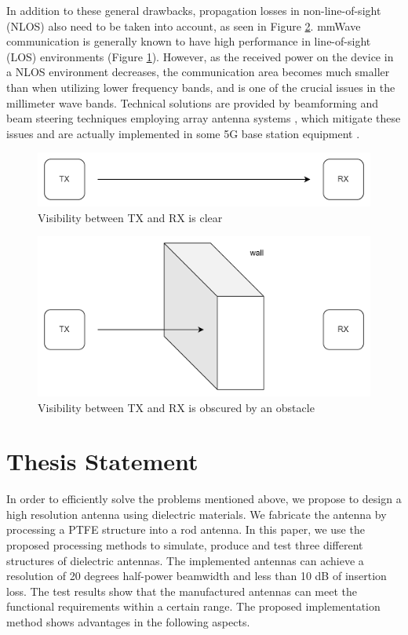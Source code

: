 \documentclass[a4paper,12pt]{report}
\begin{document}
In addition to these general drawbacks,
propagation losses in non-line-of-sight (NLOS) also need to be taken into account,
as seen in Figure \ref{fig:NLOS}.
mmWave communication is generally
known to have high performance in line-of-sight (LOS) environments (Figure \ref{fig:LOS}).
However, as the received power on the device in a NLOS environment decreases,
the communication area becomes much smaller than when
utilizing lower frequency bands,
and is one of the crucial issues in the millimeter wave bands.
Technical solutions are provided by beamforming and
beam steering techniques employing array antenna systems
\cite{6515173} \cite{7444357} \cite{9038647} \cite{7377934} \cite{8516345},
which mitigate these issues and are
actually implemented in some 5G base station equipment
\cite{https://doi.org/10.48550/arxiv.2001.05021}.


\begin{figure}
  \begin{center}
    \includegraphics[clip, keepaspectratio, width=0.5\linewidth]{img/LOS.png}
    \caption{Visibility between TX and RX is clear}
    \label{fig:LOS}
  \end{center}
\end{figure}

\begin{figure}
  \begin{center}
    \includegraphics[clip, keepaspectratio, width=0.5\linewidth]{img/NLOS.png}
    \caption{Visibility between TX and RX is obscured by an obstacle}
    \label{fig:NLOS}
  \end{center}
\end{figure}

\section{Thesis Statement}

In order to efficiently solve the problems mentioned above,
we propose to design a high resolution antenna
using dielectric materials.
We fabricate the antenna by processing a PTFE structure into a rod antenna.
In this paper,
we use the proposed processing methods to simulate,
produce and test three different structures of dielectric antennas.
The implemented antennas can achieve a resolution of
20 degrees half-power beamwidth and less than 10 dB of
insertion loss.
The test results show that the manufactured antennas
can meet the functional requirements within a certain range.
The proposed implementation method shows
advantages in the following aspects.
\end{document}
